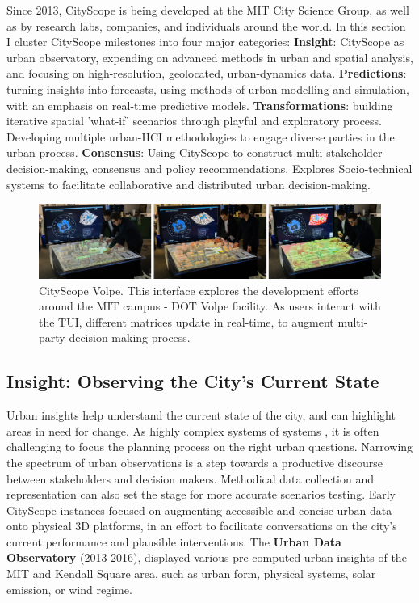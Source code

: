 {Since 2013, CityScope is being developed at the MIT City Science Group, as well as by research labs, companies, and individuals around the world. In this section I cluster CityScope milestones into four major categories: \textbf{Insight}: CityScope as urban observatory, expending on advanced methods in urban and spatial analysis, and focusing on high-resolution, geolocated, urban-dynamics data. \textbf{Predictions}: turning insights into forecasts, using methods of urban modelling and simulation, with an emphasis on real-time predictive models. \textbf{Transformations}: building iterative spatial 'what-if' scenarios through playful and exploratory process. Developing multiple urban-HCI methodologies to engage diverse parties in the urban process. \textbf{Consensus}: Using CityScope to construct multi-stakeholder decision-making, consensus and policy recommendations. Explores Socio-technical systems to facilitate collaborative and distributed urban decision-making.}



\begin{figure}
\begin{center}
    \includegraphics[width=\textwidth]{figures/volpe_all.jpg}
\end{center}
   \caption{CityScope Volpe. This interface explores the development efforts around the MIT campus - DOT Volpe facility. As users interact with the TUI, different matrices update in real-time, to augment multi-party decision-making process. }
\label{fig:volpe_all}
\end{figure}


\subsection{Insight: Observing the City's Current State}

{Urban insights help understand the current state of the city, and can highlight areas in need for change. As highly complex systems of systems \cite{Batty2009}, it is often challenging to focus the planning process on the right urban questions. Narrowing the spectrum of urban observations is a step towards a productive discourse between stakeholders and decision makers. Methodical data collection and representation can also set the stage for more accurate scenarios testing. Early CityScope instances focused on augmenting accessible and concise urban data onto physical 3D platforms, in an effort to facilitate conversations on the city's current performance and plausible interventions. The \textbf{Urban Data Observatory} (2013-2016), displayed various pre-computed urban insights of the MIT and Kendall Square area, such as urban form, physical systems, solar emission, or wind regime.}

